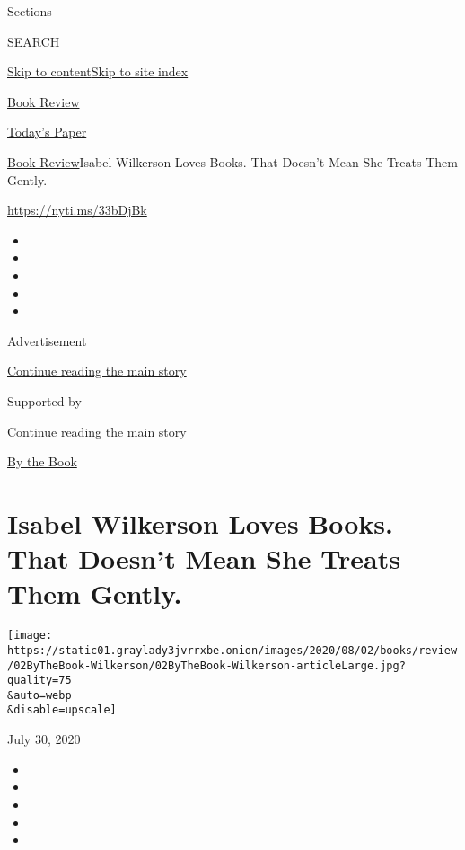 Sections

SEARCH

\protect\hyperlink{site-content}{Skip to
content}\protect\hyperlink{site-index}{Skip to site index}

\href{https://www.nytimes3xbfgragh.onion/section/books/review}{Book
Review}

\href{https://myaccount.nytimes3xbfgragh.onion/auth/login?response_type=cookie\&client_id=vi}{}

\href{https://www.nytimes3xbfgragh.onion/section/todayspaper}{Today's
Paper}

\href{/section/books/review}{Book Review}\textbar{}Isabel Wilkerson
Loves Books. That Doesn't Mean She Treats Them Gently.

\url{https://nyti.ms/33bDjBk}

\begin{itemize}
\item
\item
\item
\item
\item
\end{itemize}

Advertisement

\protect\hyperlink{after-top}{Continue reading the main story}

Supported by

\protect\hyperlink{after-sponsor}{Continue reading the main story}

\href{/column/by-the-book}{By the Book}

\hypertarget{isabel-wilkerson-loves-books-that-doesnt-mean-she-treats-them-gently}{%
\section{Isabel Wilkerson Loves Books. That Doesn't Mean She Treats Them
Gently.}\label{isabel-wilkerson-loves-books-that-doesnt-mean-she-treats-them-gently}}

\texttt{[image: https://static01.graylady3jvrrxbe.onion/images/2020/08/02/books/review/02ByTheBook-Wilkerson/02ByTheBook-Wilkerson-articleLarge.jpg?quality=75\\\&auto=webp\\\&disable=upscale]}

July 30, 2020

\begin{itemize}
\item
\item
\item
\item
\item
\end{itemize}

